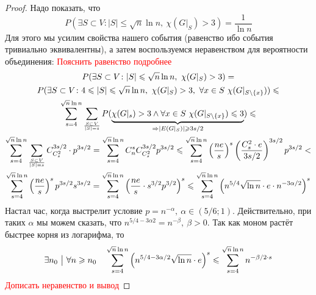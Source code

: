 \begin{proof}
	Надо показать, что
	\[
		P(\exists S \subset V \colon |S| \le \sqrt{n}\ln n,\ \chi(G|_S) > 3) = \frac{1}{\ln n}
	\]
	Для этого мы усилим свойства нашего события (равенство ибо события тривиально эквивалентны), а затем воспользуемся неравенством для вероятности объединения: \textcolor{red}{Пояснить равенство подробнее}
	\begin{multline*}
		P(\exists S \subset V \colon |S| \le \sqrt{n}\ln n,\ \chi(G|_S) > 3) =
		\\
		P(\exists S \subset V \colon 4 \le |S| \le \sqrt{n}\ln n,\ \chi(G|_S) > 3,\ \forall x \in S\ \chi(G|_{S \bs \{x\}})) \le
		\\
		\sum_{s = 4}^{\sqrt{n}\ln n} \sum_{S \subset V \over |S| = s} P(\underbrace{\chi(G|_s) > 3 \wedge \forall x \in S\ \chi(G|_{S \bs \{x\}}) \le 3}_{\Ra |E(G|_S)| \ge 3s/2}) \le
		\\
		\sum_{s = 4}^{\sqrt{n}\ln n}\sum_{S \subset V \over |S| = s} C_{C_s^2}^{3s / 2} \cdot p^{3s / 2} = \sum_{s = 4}^{\sqrt{n}\ln n} C_n^s C_{C_s^2}^{3s / 2} p^{3s / 2} \le \sum_{s = 4}^{\sqrt{n}\ln n} \ps{\frac{ne}{s}}^s \ps{\frac{C_s^2 \cdot e}{3s / 2}}^{3s / 2} p^{3s / 2} <
		\\
		\sum_{s = 4}^{\sqrt{n}\ln n} \ps{\frac{ne}{s}}^s p^{3s / 2} s^{3s / 2} = \sum_{s = 4}^{\sqrt{n}\ln n} \ps{\frac{ne}{s} \cdot s^{3 / 2} p^{3 / 2}}^s \le \sum_{s = 4}^{\sqrt{n}\ln n} \ps{n^{5 / 4}\sqrt{\ln n} \cdot e \cdot n^{-3\alpha / 2}}^s
	\end{multline*}
	Настал час, когда выстрелит условие $p = n^{-\alpha},\ \alpha \in (5 / 6; 1)$. Действительно, при таких $\alpha$ мы можем сказать, что $n^{5 / 4 - 3\alpha 2} = n^{-\beta},\ \beta > 0$. Так как моном растёт быстрее корня из логарифма, то
	\[
		\exists n_0 \ \big|\  \forall n \geqslant n_0 \quad \sum_{s = 4}^{\sqrt{n}\ln n} \left(n^{5 / 4 - 3\alpha / 2}\sqrt{\ln n} \cdot e\right)^s \leqslant \sum_{s = 4}^{\sqrt{n}\ln n} n^{-\beta / 2 \cdot s}
	\]
	\textcolor{red}{Дописать неравенство и вывод}
\end{proof}

